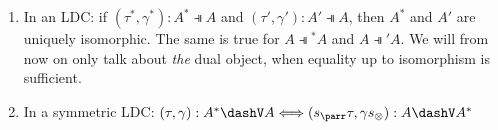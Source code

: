 \documentclass[DIN, pagenumber=false, fontsize=11pt, parskip=half, colorinlistoftodos, svgnames]{scrartcl}
\begin{document}
	\begin{lemma}
		\label{lemma: isoLinDisCat}
		
		\begin{enumerate}
			\item In an LDC: if 
			$(\tau^*, \gamma^*): A^* \dashV A $ and $(\tau', \gamma'): A' \dashV A $, 
			then $A^*$ and $A'$ are uniquely isomorphic. 
			The same is true for 
			$A \dashV {^*A} $ and $A \dashV {'A} $.
			We will from now on only talk about \emph{the} dual object, when equality up to isomorphism is sufficient.
			\item In a symmetric LDC: 
			$(\tau, \gamma): A^* \dashV A 
			\Longleftrightarrow 
			(s_{\parr} \tau , \gamma s_{\otimes} ): A \dashV A^* $ 
		\end{enumerate}
	\end{lemma}
	
\end{document}
